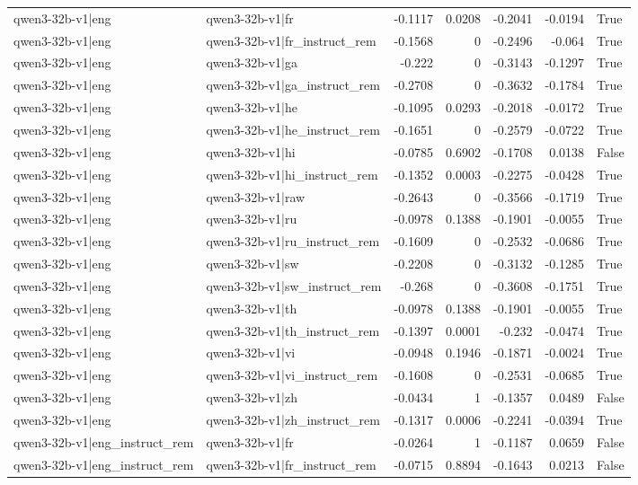 \begin{table}
\begin{tabular}{l l r r r r l}
qwen3-32b-v1|eng & qwen3-32b-v1|fr & -0.1117 & 0.0208 & -0.2041 & -0.0194 & True \\
qwen3-32b-v1|eng & qwen3-32b-v1|fr_instruct_rem & -0.1568 & 0 & -0.2496 & -0.064 & True \\
qwen3-32b-v1|eng & qwen3-32b-v1|ga & -0.222 & 0 & -0.3143 & -0.1297 & True \\
qwen3-32b-v1|eng & qwen3-32b-v1|ga_instruct_rem & -0.2708 & 0 & -0.3632 & -0.1784 & True \\
qwen3-32b-v1|eng & qwen3-32b-v1|he & -0.1095 & 0.0293 & -0.2018 & -0.0172 & True \\
qwen3-32b-v1|eng & qwen3-32b-v1|he_instruct_rem & -0.1651 & 0 & -0.2579 & -0.0722 & True \\
qwen3-32b-v1|eng & qwen3-32b-v1|hi & -0.0785 & 0.6902 & -0.1708 & 0.0138 & False \\
qwen3-32b-v1|eng & qwen3-32b-v1|hi_instruct_rem & -0.1352 & 0.0003 & -0.2275 & -0.0428 & True \\
qwen3-32b-v1|eng & qwen3-32b-v1|raw & -0.2643 & 0 & -0.3566 & -0.1719 & True \\
qwen3-32b-v1|eng & qwen3-32b-v1|ru & -0.0978 & 0.1388 & -0.1901 & -0.0055 & True \\
qwen3-32b-v1|eng & qwen3-32b-v1|ru_instruct_rem & -0.1609 & 0 & -0.2532 & -0.0686 & True \\
qwen3-32b-v1|eng & qwen3-32b-v1|sw & -0.2208 & 0 & -0.3132 & -0.1285 & True \\
qwen3-32b-v1|eng & qwen3-32b-v1|sw_instruct_rem & -0.268 & 0 & -0.3608 & -0.1751 & True \\
qwen3-32b-v1|eng & qwen3-32b-v1|th & -0.0978 & 0.1388 & -0.1901 & -0.0055 & True \\
qwen3-32b-v1|eng & qwen3-32b-v1|th_instruct_rem & -0.1397 & 0.0001 & -0.232 & -0.0474 & True \\
qwen3-32b-v1|eng & qwen3-32b-v1|vi & -0.0948 & 0.1946 & -0.1871 & -0.0024 & True \\
qwen3-32b-v1|eng & qwen3-32b-v1|vi_instruct_rem & -0.1608 & 0 & -0.2531 & -0.0685 & True \\
qwen3-32b-v1|eng & qwen3-32b-v1|zh & -0.0434 & 1 & -0.1357 & 0.0489 & False \\
qwen3-32b-v1|eng & qwen3-32b-v1|zh_instruct_rem & -0.1317 & 0.0006 & -0.2241 & -0.0394 & True \\
qwen3-32b-v1|eng_instruct_rem & qwen3-32b-v1|fr & -0.0264 & 1 & -0.1187 & 0.0659 & False \\
qwen3-32b-v1|eng_instruct_rem & qwen3-32b-v1|fr_instruct_rem & -0.0715 & 0.8894 & -0.1643 & 0.0213 & False \\

\end{tabular}
\end{table}
